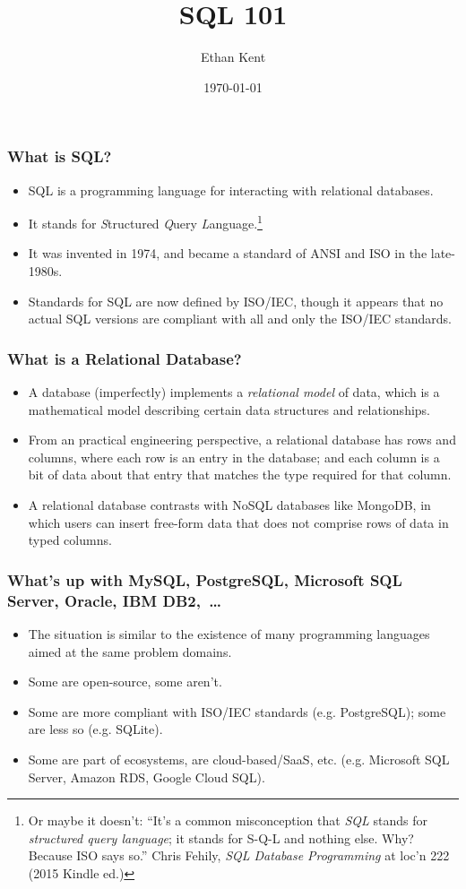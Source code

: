 \documentclass{beamer}
\title{SQL 101}
\author{Ethan Kent}
\institute{Spoonflower}
\date{\today}
\begin{document}
\frame{\titlepage}

\begin{frame}
  \frametitle{What is SQL?}
  \begin{itemize}
    \item SQL is a programming language for interacting with relational databases.
    \item It stands for \emph{S}tructured \emph{Q}uery
          \emph{L}anguage.\footnote{Or maybe it doesn't: ``It's a common
            misconception that \textit{SQL} stands for \textit{structured query
              language}; it stands for S-Q-L and nothing else. Why? Because ISO
            says so.'' Chris Fehily, \textit{SQL Database Programming} at loc'n
            222 (2015 Kindle ed.)}
    \item It was invented in 1974, and became a standard of ANSI and ISO in
          the late-1980s.
    \item Standards for SQL are now defined by ISO/IEC, though it appears that
          no actual SQL versions are compliant with all and only the ISO/IEC
          standards.
  \end{itemize}
\end{frame}

\begin{frame}
  \frametitle{What is a Relational Database?}
  \begin{itemize}
    \item A database (imperfectly) implements a \textit{relational model} of
          data, which is a mathematical model describing certain data
          structures and relationships.
    \item From an practical engineering perspective, a relational database
          has rows and columns, where each row is an entry in the database; and
          each column is a bit of data about that entry that matches the type
          required for that column.
    \item A relational database contrasts with NoSQL databases like MongoDB,
          in which users can insert free-form data that does not comprise
          rows of data in typed columns.
  \end{itemize}
\end{frame}

\begin{frame}
  \frametitle{What's up with MySQL, PostgreSQL, Microsoft SQL Server, Oracle, IBM DB2,~\ldots}
  \begin{itemize}
    \item The situation is similar to the existence of many programming
          languages aimed at the same problem domains.
    \item Some are open-source, some aren't.
    \item Some are more compliant with ISO/IEC standards (e.g. PostgreSQL);
          some are less so (e.g. SQLite).
    \item Some are part of ecosystems, are cloud-based/SaaS, etc. (e.g. Microsoft SQL
          Server, Amazon RDS, Google Cloud SQL).
  \end{itemize}
\end{frame}
\end{document}
